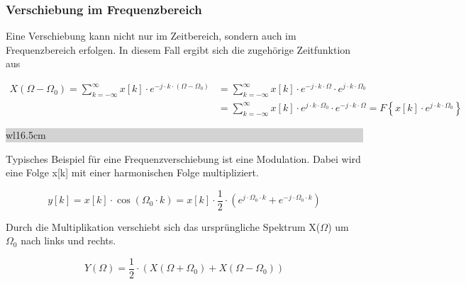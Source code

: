 \clearpage

\subsubsection{Verschiebung im Frequenzbereich}

\noindent Eine Verschiebung kann nicht nur im Zeitbereich, sondern auch im Frequenzbereich erfolgen. In diesem Fall ergibt sich die zugeh\"{o}rige Zeitfunktion aus

\begin{equation}\label{eq:sevenfiftynine}
\begin{split}
X\left(\Omega -\Omega _{0} \right)=\sum _{k=-\infty }^{\infty }x\left[k\right]\cdot e^{-j\cdot k\cdot \left(\Omega -\Omega _{0} \right)} & =\sum _{k=-\infty }^{\infty }x\left[k\right]\cdot e^{-j\cdot k\cdot \Omega } \cdot e^{j\cdot k\cdot \Omega _{0}} \\
&=\sum _{k=-\infty }^{\infty }x\left[k\right]\cdot e^{j\cdot k\cdot \Omega _{0} } \cdot e^{-j\cdot k\cdot \Omega }  =F\left\{x\left[k\right]\cdot e^{j\cdot k\cdot \Omega _{0} } \right\}
\end{split}
\end{equation}

\noindent
\colorbox{lightgray}{%
%
\renewcommand\arraystretch{0.6}%
\begin{tabular}{ wl{16.5cm} }
{\selectfont{Beispiel: Frequenzverschiebung}}
\end{tabular}%
}\medskip

\noindent Typisches Beispiel f\"{u}r eine Frequenzverschiebung ist eine Modulation. Dabei wird eine Folge x[k] mit einer harmonischen Folge multipliziert.

\begin{equation}\label{eq:sevensixty}
y\left[k\right]=x\left[k\right]\cdot \cos \left(\Omega _{0} \cdot k\right)=x\left[k\right]\cdot \frac{1}{2} \cdot \left(e^{j\cdot \Omega _{0} \cdot k} +e^{-j\cdot \Omega _{0} \cdot k} \right)
\end{equation}

\noindent Durch die Multiplikation verschiebt sich das urspr\"{u}ngliche Spektrum X($\Omega$) um $\Omega_{0}$ nach links und rechts.

\begin{equation}\label{eq:sevensixtyone}
Y\left(\Omega \right)=\frac{1}{2} \cdot \left(X\left(\Omega +\Omega _{0} \right)+X\left(\Omega -\Omega _{0} \right)\right)
\end{equation}

